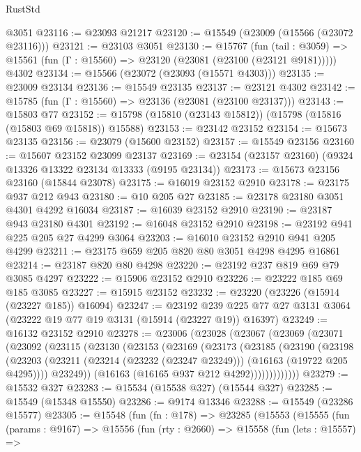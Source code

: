\begin{lexlean}{RustStd}
\begin{coremodule}
    @3051
@23116 := @23093 @21217
@23120 := @15549 (@23009 (@15566 (@23072 @23116)))
@23121 := @23103 @3051
@23130 := @15767
    (fun (tail : @3059) => @15561 (fun (Γ : @15560) => @23120 (@23081 (@23100 (@23121 @9181)))))
    @4302
@23134 := @15566 (@23072 (@23093 (@15571 @4303)))
@23135 := @23009 @23134
@23136 := @15549 @23135
@23137 := @23121 @4302
@23142 := @15785 (fun (Γ : @15560) => @23136 (@23081 (@23100 @23137)))
@23143 := @15803 @77
@23152 := @15798 (@15810 (@23143 @15812)) (@15798 (@15816 (@15803 @69 @15818)) @15588)
@23153 := @23142 @23152
@23154 := @15673 @23135
@23156 := @23079 (@15600 @23152)
@23157 := @15549 @23156
@23160 := @15607 @23152 @23099 @23137
@23169 := @23154 (@23157 @23160) (@9324 @13326 @13322 @23134 @13333 (@9195 @23134))
@23173 := @15673 @23156 @23160 (@15844 @23078)
@23175 := @16019 @23152 @2910
@23178 := @23175 @937 @212 @943
@23180 := @10 @205 @27
@23185 := @23178 @23180 @3051 @4301 @4292 @16034
@23187 := @16039 @23152 @2910
@23190 := @23187 @943 @23180 @4301
@23192 := @16048 @23152 @2910
@23198 := @23192 @941 @225 @205 @27 @4299 @3064
@23203 := @16010 @23152 @2910 @941 @205 @4299
@23211 := @23175 @659 @205 @820 @80 @3051 @4298 @4295 @16861
@23214 := @23187 @820 @80 @4298
@23220 := @23192 @237 @819 @69 @79 @3085 @4297
@23222 := @15906 @23152 @2910
@23226 := @23222 @185 @69 @185 @3085
@23227 := @15915 @23152
@23232 := @23220 (@23226 (@15914 (@23227 @185)) @16094)
@23247 := @23192
    @239
    @225
    @77
    @27
    @3131
    @3064
    (@23222 @19 @77 @19 @3131 (@15914 (@23227 @19)) @16397)
@23249 := @16132 @23152 @2910
@23278 := @23006
    (@23028
      (@23067
        (@23069
          (@23071
            (@23092
              (@23115
                (@23130
                  (@23153
                    (@23169
                      (@23173
                        (@23185
                          (@23190
                            (@23198
                              (@23203
                                (@23211
                                  (@23214 (@23232 (@23247 @23249)))
                                  (@16163 (@19722 @205 @4295))))
                              @23249))
                          (@16163 (@16165 @937 @212 @4292)))))))))))))
@23279 := @15532 @327
@23283 := @15534 (@15538 @327) (@15544 @327)
@23285 := @15549 (@15348 @15550)
@23286 := @9174 @13346
@23288 := @15549 (@23286 @15577)
@23305 := @15548
    (fun (fn : @178) =>
    @23285
      (@15553
        (@15555
          (fun (params : @9167) =>
          @15556
            (fun (rty : @2660) =>
            @15558
              (fun (lets : @15557) =>

\end{coremodule}
\end{lexlean}
